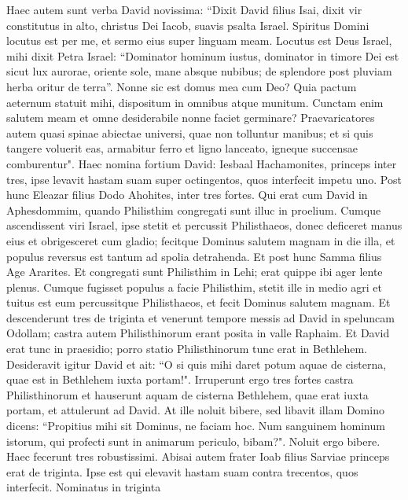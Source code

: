 \begin{biblechapter}  
\verse Haec autem sunt verba David novissima: “Dixit David filius Isai, dixit vir constitutus in alto, christus Dei Iacob, suavis psalta Israel. 
\verse Spiritus Domini locutus est per me, et sermo eius super linguam meam. 
\verse Locutus est Deus Israel, mihi dixit Petra Israel: “Dominator hominum iustus, dominator in timore Dei 
\verse est sicut lux aurorae, oriente sole, mane absque nubibus; de splendore post pluviam herba oritur de terra”. 
\verse Nonne sic est domus mea cum Deo? Quia pactum aeternum statuit mihi, dispositum in omnibus atque munitum. Cunctam enim salutem meam et omne desiderabile nonne faciet germinare? 
\verse Praevaricatores autem quasi spinae abiectae universi, quae non tolluntur manibus; 
\verse et si quis tangere voluerit eas, armabitur ferro et ligno lanceato, igneque succensae comburentur". 
\verse Haec nomina fortium David: Iesbaal Hachamonites, princeps inter tres, ipse levavit hastam suam super octingentos, quos interfecit impetu uno. 
\verse Post hunc Eleazar filius Dodo Ahohites, inter tres fortes. Qui erat cum David in Aphesdommim, quando Philisthim congregati sunt illuc in proelium. 
\verse Cumque ascendissent viri Israel, ipse stetit et percussit Philisthaeos, donec deficeret manus eius et obrigesceret cum gladio; fecitque Dominus salutem magnam in die illa, et populus reversus est tantum ad spolia detrahenda. 
\verse Et post hunc Samma filius Age Ararites. Et congregati sunt Philisthim in Lehi; erat quippe ibi ager lente plenus. Cumque fugisset populus a facie Philisthim, 
\verse stetit ille in medio agri et tuitus est eum percussitque Philisthaeos, et fecit Dominus salutem magnam. 
\verse Et descenderunt tres de triginta et venerunt tempore messis ad David in speluncam Odollam; castra autem Philisthinorum erant posita in valle Raphaim.  
\verse Et David erat tunc in praesidio; porro statio Philisthinorum tunc erat in Bethlehem. 
\verse Desideravit igitur David et ait: “O si quis mihi daret potum aquae de cisterna, quae est in Bethlehem iuxta portam!". 
\verse Irruperunt ergo tres fortes castra Philisthinorum et hauserunt aquam de cisterna Bethlehem, quae erat iuxta portam, et attulerunt ad David. At ille noluit bibere, sed libavit illam Domino 
\verse dicens: “Propitius mihi sit Dominus, ne faciam hoc. Num sanguinem hominum istorum, qui profecti sunt in animarum periculo, bibam?". Noluit ergo bibere. Haec fecerunt tres robustissimi. 
\verse Abisai autem frater Ioab filius Sarviae princeps erat de triginta. Ipse est qui elevavit hastam suam contra trecentos, quos interfecit. Nominatus in triginta 

\end{biblechapter}
